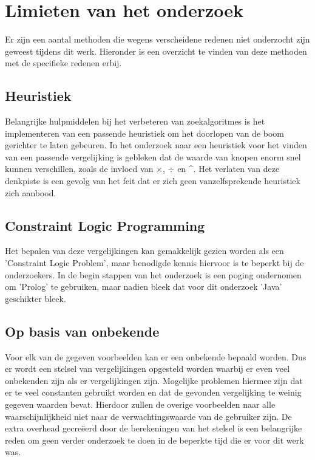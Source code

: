 \documentclass[Main.tex]{subfiles}
\begin{document}
\section{Limieten van het onderzoek}

Er zijn een aantal methoden die wegens verscheidene redenen niet onderzocht zijn geweest tijdens dit werk. Hieronder is een overzicht te vinden van deze methoden met de specifieke redenen erbij. 

\subsection{Heuristiek}
Belangrijke hulpmiddelen bij het verbeteren van zoekalgoritmes is het implementeren van een passende heuristiek om het doorlopen van de boom gerichter te laten gebeuren. In het onderzoek naar een heuristiek voor het vinden van een passende vergelijking is gebleken dat de waarde van knopen enorm snel kunnen verschillen, zoals de invloed van $\times$, $\div$ en \^{}. Het verlaten van deze denkpiste is een gevolg van het feit dat er zich geen vanzelfsprekende heuristiek zich aanbood.

\subsection{Constraint Logic Programming}
Het bepalen van deze vergelijkingen kan gemakkelijk gezien worden als een 'Constraint Logic Problem', maar benodigde kennis hiervoor is te beperkt bij de onderzoekers. In de begin stappen van het onderzoek is een poging ondernomen om 'Prolog' te gebruiken, maar nadien bleek dat voor dit onderzoek 'Java' geschikter bleek.

\subsection{Op basis van onbekende}
Voor elk van de gegeven voorbeelden kan er een onbekende  bepaald worden. Dus er wordt een stelsel van vergelijkingen opgesteld worden waarbij er even veel onbekenden zijn als er vergelijkingen zijn. Mogelijke problemen hiermee zijn dat er te veel constanten gebruikt worden en dat de gevonden vergelijking te weinig gegeven waarden bevat. Hierdoor zullen de overige voorbeelden naar alle waarschijnlijkheid niet naar de verwachtingswaarde van de gebruiker zijn. De extra overhead gecre\"eerd door de berekeningen van het stelsel is een belangrijke reden om geen verder onderzoek te doen in de beperkte tijd die er voor dit werk was.
\end{document}
